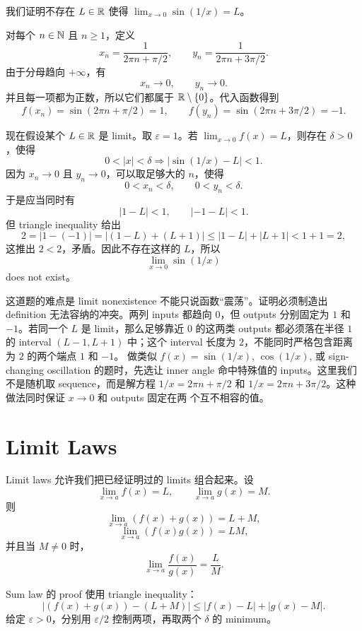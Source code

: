 \begin{solution}
我们证明不存在 \(L\in\mathbb{R}\) 使得 \(\lim_{x\to0}\sin(1/x)=L\)。

对每个 \(n\in\mathbb{N}\) 且 \(n\geq1\)，定义
\[
  x_n=\frac{1}{2\pi n+\pi/2},
  \qquad
  y_n=\frac{1}{2\pi n+3\pi/2}.
\]
由于分母趋向 \(+\infty\)，有
\[
  x_n\to0,\qquad y_n\to0.
\]
并且每一项都为正数，所以它们都属于 \(\mathbb{R}\setminus\{0\}\)。代入函数得到
\[
  f(x_n)=\sin(2\pi n+\pi/2)=1,
  \qquad
  f(y_n)=\sin(2\pi n+3\pi/2)=-1.
\]

现在假设某个 \(L\in\mathbb{R}\) 是 limit。取 \(\varepsilon=1\)。若
\(\lim_{x\to0}f(x)=L\)，则存在 \(\delta>0\)，使得
\[
  0<|x|<\delta \Longrightarrow |\sin(1/x)-L|<1.
\]
因为 \(x_n\to0\) 且 \(y_n\to0\)，可以取足够大的 \(n\)，使得
\[
  0<x_n<\delta,\qquad 0<y_n<\delta.
\]
于是应当同时有
\[
  |1-L|<1,\qquad |-1-L|<1.
\]
但 triangle inequality 给出
\[
  2=|1-(-1)|
  =
  |(1-L)+(L+1)|
  \leq
  |1-L|+|L+1|
  <
  1+1
  =
  2,
\]
这推出 \(2<2\)，矛盾。因此不存在这样的 \(L\)，所以
\[
  \lim_{x\to0}\sin(1/x)
\]
does not exist。
\end{solution}

\begin{explanation}
这道题的难点是 limit nonexistence 不能只说函数“震荡”。证明必须制造出
definition 无法容纳的冲突。两列 inputs 都趋向 \(0\)，但 outputs 分别固定为
\(1\) 和 \(-1\)。若同一个 \(L\) 是 limit，那么足够靠近 \(0\) 的这两类
outputs 都必须落在半径 \(1\) 的 interval \((L-1,L+1)\) 中；这个 interval
长度为 \(2\)，不能同时严格包含距离为 \(2\) 的两个端点 \(1\) 和 \(-1\)。
做类似 \(f(x)=\sin(1/x)\), \(\cos(1/x)\), 或 sign-changing oscillation
的题时，先选让 inner angle 命中特殊值的 inputs。这里我们不是随机取
sequence，而是解方程 \(1/x=2\pi n+\pi/2\) 和
\(1/x=2\pi n+3\pi/2\)。这种做法同时保证 \(x\to0\) 和 outputs 固定在两
个互不相容的值。
\end{explanation}

\section{Limit Laws}

Limit laws 允许我们把已经证明过的 limits 组合起来。设
\[
  \lim_{x\to a}f(x)=L,\qquad
  \lim_{x\to a}g(x)=M.
\]
则
\[
  \lim_{x\to a}(f(x)+g(x))=L+M,
\]
\[
  \lim_{x\to a}(f(x)g(x))=LM,
\]
并且当 \(M\neq0\) 时，
\[
  \lim_{x\to a}\frac{f(x)}{g(x)}=\frac{L}{M}.
\]

Sum law 的 proof 使用 triangle inequality：
\[
  |(f(x)+g(x))-(L+M)|
  \leq
  |f(x)-L|+|g(x)-M|.
\]
给定 \(\varepsilon>0\)，分别用 \(\varepsilon/2\) 控制两项，再取两个
\(\delta\) 的 minimum。

